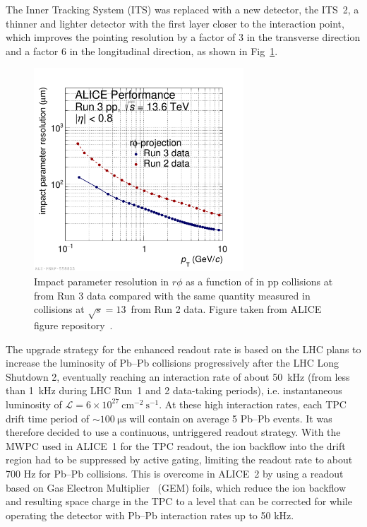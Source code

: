 The Inner Tracking System (ITS) was replaced with a new detector, the ITS~2, a thinner and lighter detector with the first layer closer to the interaction point, which improves the pointing resolution by a factor of 3 in the transverse direction and a factor 6 in the longitudinal direction, as shown in Fig~\ref{fig:ITS_res}.

\begin{figure}[htb]
    \centering
    \includegraphics[width=0.7\textwidth]{Figures/Chapter 3/sigmadcaxy_run2vsrun3data_qm.pdf}
    \caption{Impact parameter resolution in $r\phi$ as a function of \pt in pp collisions at \thirteen from Run 3 data compared with the same quantity measured in collisions at $\sqrt{s} = 13$~\tev from Run 2 data. Figure taken from ALICE figure repository~\cite{ALICE_figures}.}
    \label{fig:ITS_res}
\end{figure}

The upgrade strategy for the enhanced readout rate is based on the LHC plans to increase the luminosity of Pb--Pb collisions progressively after the LHC Long Shutdown 2, eventually reaching an interaction rate of about 50~kHz (from less than 1~kHz during LHC Run~1 and 2 data-taking periods), i.e. instantaneous luminosity of $\mathcal{L} = 6\times10^{27}~\mathrm{cm}^{-2}~\mathrm{s}^{-1}$. At these high interaction rates, each TPC drift time period of $\sim\SI{100}{\micro\second}$ will contain on average 5 Pb--Pb events. It was therefore decided to use a continuous, untriggered readout strategy. With the MWPC used in ALICE~1 for the TPC readout, the ion backflow into the drift region had to be suppressed by active gating, limiting the readout rate to about 700 Hz for Pb--Pb collisions. This is overcome in ALICE~2 by using a readout based on Gas Electron Multiplier~\cite{Sauli:1997qp} (GEM) foils, which reduce the ion backflow and resulting space charge in the TPC to a level that can be corrected for while operating the detector with Pb--Pb interaction rates up to 50 kHz. 

